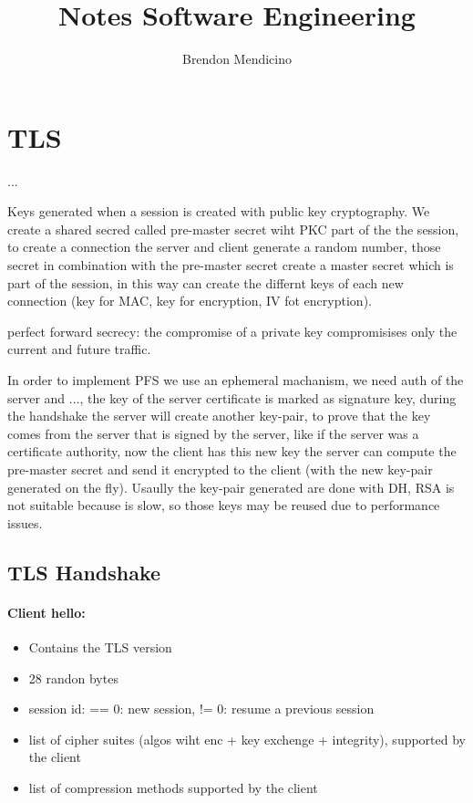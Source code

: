 \documentclass[12pt]{article}
\title{Notes Software Engineering}
\author{Brendon Mendicino}
\begin{document}
\maketitle
\newpage
\tableofcontents

\section{TLS}
...

Keys generated when a session is created with public key cryptography. We create a shared secred called pre-master secret wiht PKC part of the the session, to create a connection the server and client generate a random number, those secret in combination with the pre-master secret create a master secret which is part of the session, in this way can create the differnt keys of each new connection (key for MAC, key for encryption, IV fot encryption).

perfect forward secrecy: the compromise of a private key compromisises only the current and future traffic.

In order to implement PFS we use an ephemeral machanism, we need auth of the server and ..., the key of the server certificate is marked as signature key, during the handshake the server will create another key-pair, to prove that the key comes from the server that is signed by the server, like if the server was a certificate authority, now the client has this new key the server can compute the pre-master secret and send it encrypted to the client (with the new key-pair generated on the fly). Usaully the key-pair generated are done with DH, RSA is not suitable because is slow, so those keys may be reused due to performance issues.

\subsection{TLS Handshake}

\paragraph{Client hello:}
\begin{itemize}
  \item Contains the TLS version
  \item 28 randon bytes
  \item session id: == 0: new session, != 0: resume a previous session
  \item list of cipher suites (algos wiht enc + key exchenge + integrity), supported by the client
  \item list of compression methods supported by the client
\end{itemize}
\end{document}
